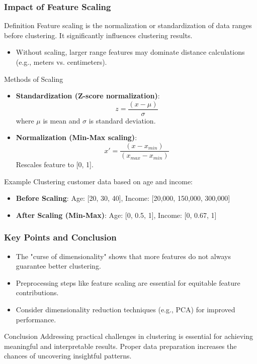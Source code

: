 \documentclass[aspectratio=169]{beamer}
\begin{document}
\begin{frame}[fragile]
    \frametitle{Impact of Feature Scaling}
    \begin{block}{Definition}
        Feature scaling is the normalization or standardization of data ranges before clustering. It significantly influences clustering results.
    \end{block}
    \begin{itemize}
        \item Without scaling, larger range features may dominate distance calculations (e.g., meters vs. centimeters).
    \end{itemize}
    \begin{block}{Methods of Scaling}
        \begin{itemize}
            \item \textbf{Standardization (Z-score normalization)}:
            \begin{equation}
                z = \frac{(x - \mu)}{\sigma}
            \end{equation}
            where $\mu$ is mean and $\sigma$ is standard deviation.
            \item \textbf{Normalization (Min-Max scaling)}:
            \begin{equation}
                x' = \frac{(x - x_{min})}{(x_{max} - x_{min})}
            \end{equation}
            Rescales feature to [0, 1].
        \end{itemize}
    \end{block}
    \begin{block}{Example}
        Clustering customer data based on age and income:
        \begin{itemize}
            \item \textbf{Before Scaling}: Age: [20, 30, 40], Income: [20,000, 150,000, 300,000]
            \item \textbf{After Scaling (Min-Max)}: Age: [0, 0.5, 1], Income: [0, 0.67, 1]
        \end{itemize}
    \end{block}
\end{frame}

\begin{frame}[fragile]
    \frametitle{Key Points and Conclusion}
    \begin{itemize}
        \item The "curse of dimensionality" shows that more features do not always guarantee better clustering.
        \item Preprocessing steps like feature scaling are essential for equitable feature contributions.
        \item Consider dimensionality reduction techniques (e.g., PCA) for improved performance.
    \end{itemize}
    \begin{block}{Conclusion}
        Addressing practical challenges in clustering is essential for achieving meaningful and interpretable results. Proper data preparation increases the chances of uncovering insightful patterns.
    \end{block}
\end{frame}
\end{document}
